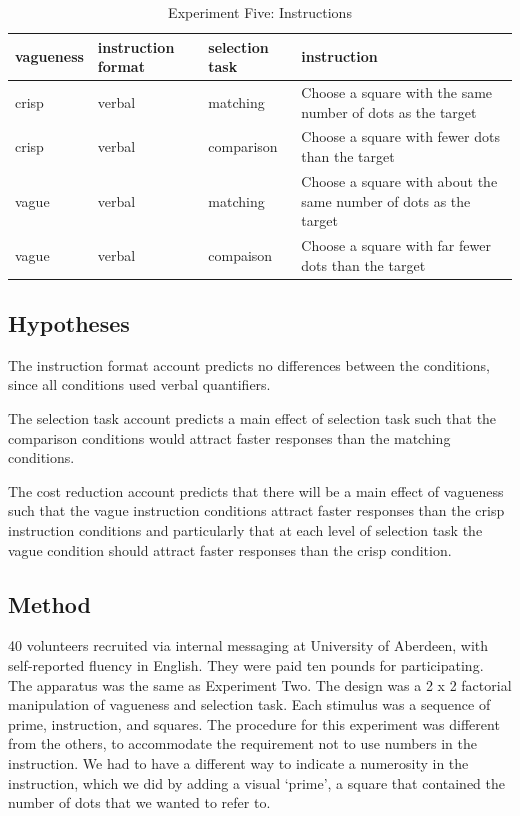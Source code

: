 \documentclass[doc,apacite]{apa6}
\begin{document}
\begin{table}[htbp]
\centering
\caption{Experiment Five: Instructions}
\label{Instructions for e5}
\begin{tabular}{lllp{7cm}}
\hline
vagueness&instruction format& selection task&instruction\\
\hline
crisp & verbal&matching & Choose a square with the same number of dots as the target \\ 
crisp & verbal&comparison& Choose a square with fewer dots than the target \\
vague & verbal&matching & Choose a square with about the same number of dots as the target \\ 
vague & verbal&compaison& Choose a square with far fewer dots than the target \\ 
\hline
\end{tabular}
\end{table}%

\subsection{Hypotheses}
The instruction format account predicts no differences between the conditions, since all conditions used verbal quantifiers.

The selection task account predicts a main effect of selection task such that the comparison conditions would attract faster responses than the matching conditions.

The cost reduction account predicts that there will be a main effect of vagueness such that the vague instruction conditions attract faster responses than the crisp instruction conditions and particularly that at each level of selection task the vague condition should attract faster responses than the crisp condition.

\subsection{Method}

40 volunteers recruited via internal messaging at University of Aberdeen, with self-reported fluency in English. They were paid ten pounds for participating. 
The apparatus was the same as Experiment Two.
The design was a 2 x 2 factorial manipulation of vagueness and selection task.
Each stimulus was a sequence of prime, instruction, and squares.
The procedure for this experiment was different from the others, to accommodate the requirement not to use numbers in the instruction. We had to have a different way to indicate a numerosity in the instruction, which we did by adding a visual `prime', a square that contained the number of dots that we wanted to refer to.
\end{document}
